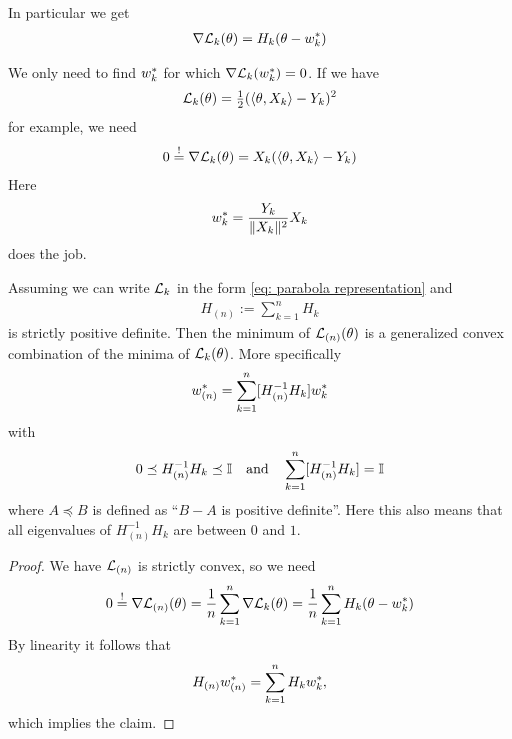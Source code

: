In particular we get
\begin{align}\label{eq: hessian representation of the gradient}
	\nabla\mathcal{L}_k(\theta) = H_k(\theta - w^*_k)
\end{align}

\begin{example}
	We only need to find \(w^*_k\) for which \(\nabla\mathcal{L}_k(w^*_k)=0\).
	If we have
	\begin{align*}
		\mathcal{L}_k(\theta) = \tfrac12(\langle \theta, X_k\rangle - Y_k)^2
	\end{align*}	
	for example, we need
	\begin{align*}
		0\overset!=\nabla\mathcal{L}_k(\theta) = X_k (\langle \theta, X_k\rangle - Y_k)
	\end{align*}
	Here
	\begin{align*}
		w^*_k = \frac{Y_k}{\|X_k\|^2}X_k
	\end{align*}
	does the job.
\end{example}

\begin{theorem}
	\label{thm: convex combination of minima}
	Assuming we can write \(\mathcal{L}_k\) in the form \eqref{eq: parabola representation} and
	\begin{align*}
		H_{(n)}:=\sum_{k=1}^n H_k
	\end{align*}
	is strictly positive definite. Then the minimum of \(\mathcal{L}_{(n)}(\theta)\) is a
	generalized convex combination of the minima of \(\mathcal{L}_k(\theta)\). More
	specifically
	\begin{align*}
		w^*_{(n)} = \sum_{k=1}^n [H_{(n)}^{-1} H_k] w^*_{k}
	\end{align*}
	with
	\begin{align*}
		0\preceq H_{(n)}^{-1}H_k\preceq \mathbb{I}
		\quad \text{and}\quad
		\sum_{k=1}^n [H_{(n)}^{-1} H_k] = \mathbb{I}
	\end{align*}
	where \(A\preceq B\) is defined as ``\(B-A\) is positive definite''. Here
	this also means that all eigenvalues of \(H_{(n)}^{-1}H_k\) are between
	\(0\) and \(1\).
\end{theorem}
\begin{proof}
	We have \(\mathcal{L}_{(n)}\) is strictly convex, so we need
	\begin{align*}
		0 \overset!= \nabla\mathcal{L}_{(n)}(\theta)
		=\frac1n \sum_{k=1}^n \nabla\mathcal{L}_k(\theta)
		= \frac1n \sum_{k=1}^n H_k(\theta - w^*_k)
	\end{align*}
	By linearity it follows that
	\begin{align*}
		H_{(n)} w^*_{(n)} = \sum_{k=1}^n H_k w^*_k,
	\end{align*}
	which implies the claim.
\end{proof}

